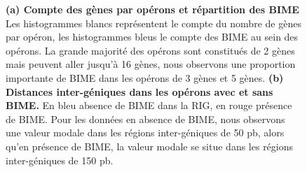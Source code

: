 \documentclass[12pt,a4paper]{report}
\begin{document}
\begin{onehalfspace}
\begin{figure}[ht]
\centering
{}
\caption{\textbf{(a) Compte des gènes par opérons et répartition des BIME} Les histogrammes blancs représentent le compte du nombre de gènes par opéron, les histogrammes bleus le compte des BIME au sein des opérons. La grande majorité des opérons sont constitués de 2 gènes mais peuvent aller jusqu'à 16 gènes, nous observons une proportion importante de BIME dans les opérons de 3 gènes et 5 gènes. \textbf{(b) Distances inter-géniques dans les opérons avec et sans BIME.} En bleu absence de BIME dans la RIG, en rouge présence de BIME. Pour les données en absence de BIME, nous observons une valeur modale dans les régions inter-géniques de 50 pb, alors qu'en présence de BIME, la valeur modale se situe dans les régions inter-géniques de 150 pb.}
\label{fig:operon}
\end{figure}


\end{onehalfspace}
\end{document}
